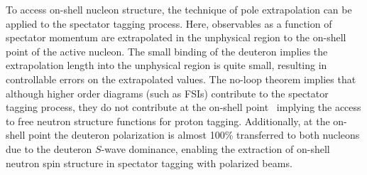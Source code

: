 To access on-shell nucleon structure, the technique of pole extrapolation can be applied to the spectator tagging process.  Here, observables as a function of spectator momentum are extrapolated in the unphysical region to the on-shell point of the active nucleon.  The small binding of the deuteron implies the extrapolation length into the unphysical region is quite small, resulting in controllable errors on the extrapolated values.  The no-loop theorem implies that although higher order diagrams (such as FSIs) contribute to the spectator tagging process, they do not contribute at the on-shell point~\cite{Sargsian:2005rm} implying the access to free neutron structure functions for proton tagging.  Additionally, at the on-shell point the deuteron polarization is almost 100\% transferred to both nucleons due to the deuteron $S$-wave dominance, enabling the extraction of on-shell neutron spin structure in spectator tagging with polarized beams.  

